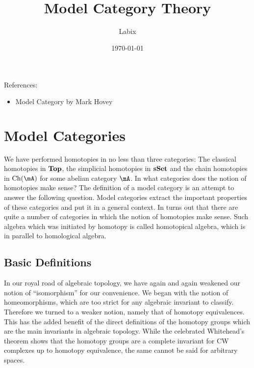 \documentclass[a4paper]{article}
\title{Model Category Theory}
\author{Labix}
\date{\today}
\begin{document}
\maketitle
\begin{abstract}

\end{abstract}
References: 
\begin{itemize}
\item Model Category by Mark Hovey
\end{itemize}
\pagebreak
\tableofcontents

\pagebreak
\section{Model Categories}
We have performed homotopies in no less than three categories: The classical homotopies in $\bold{Top}$, the simplicial homotopies in $\bold{sSet}$ and the chain homotopies in $\text{Ch}(\mA)$ for some abelian category $\mA$. In what categories does the notion of homotopies make sense? The definition of a model category is an attempt to answer the following question. Model categories extract the important properties of these categories and put it in a general context. In turns out that there are quite a number of categories in which the notion of homotopies make sense. Such algebra which was initiated by homotopy is called homotopical algebra, which is in parallel to homological algebra. 

\subsection{Basic Definitions}
In our royal road of algebraic topology, we have again and again weakened our notion of ``isomorphism'' for our convenience. We began with the notion of homeomorphisms, which are too strict for any algebraic invariant to classify. Therefore we turned to a weaker notion, namely that of homotopy equivalences. This has the added benefit of the direct definitions of the homotopy groups which are the main invariants in algebraic topology. While the celebrated Whitehead's theorem shows that the homotopy groups are a complete invariant for CW complexes up to homotopy equivalence, the same cannot be said for arbitrary spaces. \\
\end{document}
